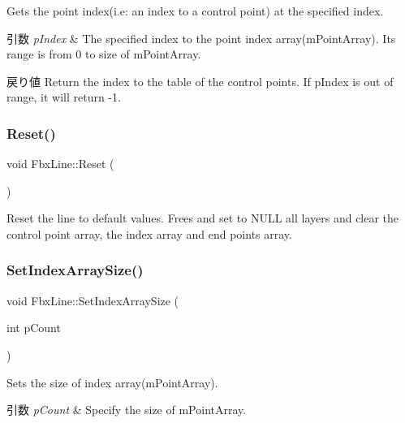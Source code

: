 Gets the point index(i.\+e\+: an index to a control point) at the specified index. 
\begin{DoxyParams}{引数}
{\em p\+Index} & The specified index to the point index array(m\+Point\+Array). Its range is from 0 to size of m\+Point\+Array. \\
\hline
\end{DoxyParams}
\begin{DoxyReturn}{戻り値}
Return the index to the table of the control points. If p\+Index is out of range, it will return -\/1. 
\end{DoxyReturn}
\mbox{\label{class_fbx_line_a68cc770a24367ac688fa3f96cdd5ed1f}} 
\subsubsection{\texorpdfstring{Reset()}{Reset()}}
{\footnotesize\ttfamily void Fbx\+Line\+::\+Reset (\begin{DoxyParamCaption}{ }\end{DoxyParamCaption})}

Reset the line to default values. Frees and set to {\ttfamily N\+U\+LL} all layers and clear the control point array, the index array and end points array. \mbox{\label{class_fbx_line_ae954e7ff77330b0da208d727b194bf75}} 
\subsubsection{\texorpdfstring{Set\+Index\+Array\+Size()}{SetIndexArraySize()}}
{\footnotesize\ttfamily void Fbx\+Line\+::\+Set\+Index\+Array\+Size (\begin{DoxyParamCaption}\item[{int}]{p\+Count }\end{DoxyParamCaption})}

Sets the size of index array(m\+Point\+Array). 
\begin{DoxyParams}{引数}
{\em p\+Count} & Specify the size of m\+Point\+Array. \\
\hline
\end{DoxyParams}
\mbox{\label{class_fbx_line_a891629171b278b9ed9f8ebde8acca2b1}} 
